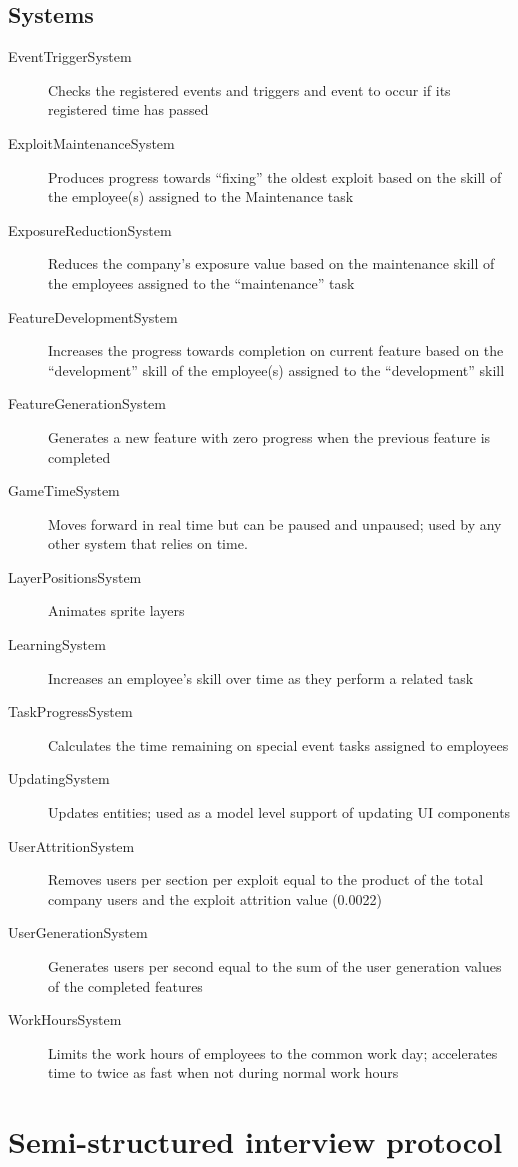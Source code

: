 \documentclass[letterpaper]{article}
\begin{document}
\subsection*{Systems}
\begin{description}
\item[EventTriggerSystem]
 Checks the registered events and triggers and event to occur if its registered time has passed
\item[ExploitMaintenanceSystem] Produces progress towards ``fixing'' the oldest exploit based on the skill of the employee(s) assigned to the Maintenance task
\item[ExposureReductionSystem] Reduces the company’s exposure value based on the maintenance skill of the employees assigned to the “maintenance” task
\item[FeatureDevelopmentSystem] Increases the progress towards completion on current feature based on the “development” skill of the employee(s) assigned to the “development” skill
\item[FeatureGenerationSystem] Generates a new feature with zero progress when the previous feature is completed
\item[GameTimeSystem] Moves forward in real time but can be paused and unpaused; used by any other system that relies on time.
\item[LayerPositionsSystem] Animates sprite layers
\item[LearningSystem] Increases an employee’s skill over time as they perform a related task
\item[TaskProgressSystem] Calculates the time remaining on special event tasks assigned to employees
\item[UpdatingSystem] Updates entities; used as a model level support of updating UI components
\item[UserAttritionSystem] Removes users per section per exploit equal to the product of the total company users and the exploit attrition value (0.0022)
\item[UserGenerationSystem] Generates users per second equal to the sum of the user generation values of the completed features
\item[WorkHoursSystem] Limits the work hours of employees to the common work day; accelerates time to twice as fast when not during normal work hours
\end{description}



\clearpage
\section{Semi-structured interview protocol}
\label{appendix:interview-protocol}
\end{document}
